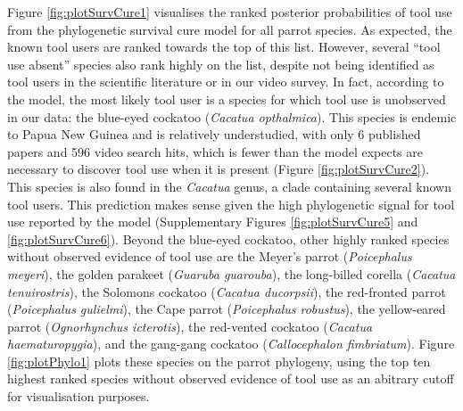 \documentclass[
  man,floatsintext]{apa6}
\begin{document}
Figure \ref{fig:plotSurvCure1} visualises the ranked posterior probabilities of tool use from the phylogenetic survival cure model for all parrot species. As expected, the known tool users are ranked towards the top of this list. However, several ``tool use absent'' species also rank highly on the list, despite not being identified as tool users in the scientific literature or in our video survey. In fact, according to the model, the most likely tool user is a species for which tool use is unobserved in our data: the blue-eyed cockatoo (\emph{Cacatua opthalmica}). This species is endemic to Papua New Guinea and is relatively understudied, with only 6 published papers and 596 video search hits, which is fewer than the model expects are necessary to discover tool use when it is present (Figure \ref{fig:plotSurvCure2}). This species is also found in the \emph{Cacatua} genus, a clade containing several known tool users. This prediction makes sense given the high phylogenetic signal for tool use reported by the model (Supplementary Figures \ref{fig:plotSurvCure5} and \ref{fig:plotSurvCure6}). Beyond the blue-eyed cockatoo, other highly ranked species without observed evidence of tool use are the Meyer's parrot (\emph{Poicephalus meyeri}), the golden parakeet (\emph{Guaruba guarouba}), the long-billed corella (\emph{Cacatua tenuirostris}), the Solomons cockatoo (\emph{Cacatua ducorpsii}), the red-fronted parrot (\emph{Poicephalus gulielmi}), the Cape parrot (\emph{Poicephalus robustus}), the yellow-eared parrot (\emph{Ognorhynchus icterotis}), the red-vented cockatoo (\emph{Cacatua haematuropygia}), and the gang-gang cockatoo (\emph{Callocephalon fimbriatum}). Figure \ref{fig:plotPhylo1} plots these species on the parrot phylogeny, using the top ten highest ranked species without observed evidence of tool use as an abitrary cutoff for visualisation purposes.
\end{document}
